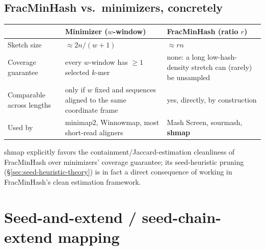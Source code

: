 \subsection{FracMinHash vs.\ minimizers, concretely}
\label{sec:fracminhash-vs-minimizer}

\begin{center}
\begin{tabular}{@{}p{4cm}p{5.4cm}p{5.4cm}@{}}
\toprule
 & \textbf{Minimizer ($w$-window)} & \textbf{FracMinHash (ratio $r$)} \\
\midrule
Sketch size & $\approx 2n/(w{+}1)$ & $\approx rn$ \\
Coverage guarantee & every $w$-window has $\ge 1$ selected $k$-mer & none: a long low-hash-density
  stretch can (rarely) be unsampled \\
Comparable across lengths & only if $w$ fixed and sequences aligned to the same coordinate frame
  & yes, directly, by construction \\
Used by & minimap2, Winnowmap, most short-read aligners & Mash Screen, sourmash, \textbf{shmap} \\
\bottomrule
\end{tabular}
\end{center}

shmap explicitly favors the containment/Jaccard-estimation cleanliness of FracMinHash over
minimizers' coverage guarantee; its seed-heuristic pruning (\S\ref{sec:seed-heuristic-theory}) is
in fact a direct consequence of working in FracMinHash's clean estimation framework.

\section{Seed-and-extend / seed-chain-extend mapping}
\label{sec:seed-extend}

